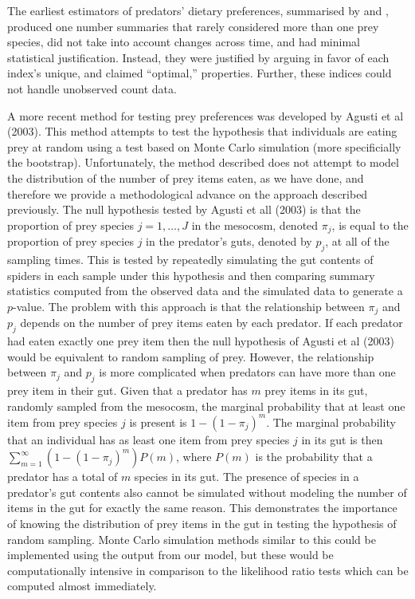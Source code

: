\documentclass[smallextended]{svjour3}
\begin{document}
The earliest estimators of predators' dietary preferences, summarised by \citet{Lechowicz:1982} and \citet{Manly:2002}, produced one number summaries that rarely considered more than one prey species, did not take into account changes across time, and had minimal statistical justification.  Instead, they were justified by arguing in favor of each index's unique, and claimed ``optimal,'' properties.  Further, these indices could not handle unobserved count data.

A more recent method for testing prey preferences was developed by Agusti et al (2003).  This method attempts to test the hypothesis that individuals are eating prey at random using a test based on Monte Carlo simulation (more specificially the bootstrap).  Unfortunately, the method described does not attempt to model the distribution of the number of prey items eaten, as we have done, and therefore we provide a methodological advance on the approach described previously.  The null hypothesis tested by Agusti et all (2003) is that the proportion of prey species $j=1,\ldots,J$ in the mesocosm, denoted $\pi_j$, is equal to the proportion of prey species $j$ in the predator's guts, denoted by $p_j$, at all of the sampling times.  This is tested by repeatedly simulating the gut contents of spiders in each sample under this hypothesis and then comparing summary statistics computed from the observed data and the simulated data to generate a $p$-value.  The problem with this approach is that the relationship between $\pi_j$ and $p_j$ depends on the number of prey items eaten by each predator.  If each predator had eaten exactly one prey item then the null hypothesis of Agusti et al (2003) would be equivalent to random sampling of prey.  However, the relationship between $\pi_j$ and $p_j$ is more complicated when predators can have more than one prey item in their gut.  Given that a predator has $m$ prey items in its gut, randomly sampled from the mesocosm, the marginal probability that at least one item from prey species $j$ is present is $1-(1-\pi_j)^m$.  The marginal probability that an individual has as least one item from prey species $j$ in its gut is then $\sum_{m=1}^{\infty} (1-(1-\pi_j)^m)P(m)$, where $P(m)$ is the probability that a predator has a total of $m$ species in its gut.  The presence of species in a predator's gut contents also cannot be simulated without modeling the number of items in the gut for exactly the same reason.  This demonstrates the importance of knowing the distribution of prey items in the gut in testing the hypothesis of random sampling.  Monte Carlo simulation methods similar to this could be implemented using the output from our model, but these would be computationally intensive in comparison to the likelihood ratio tests which can be computed almost immediately.
\end{document}
